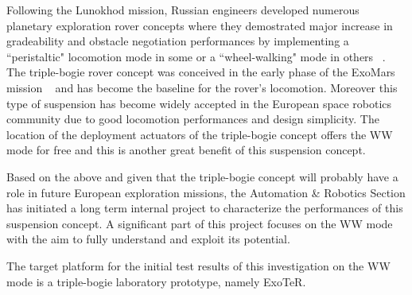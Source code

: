 \documentclass[a4paper,twocolumn]{esapub2005} %
\begin{document}
Following the Lunokhod mission, Russian engineers developed numerous planetary exploration rover concepts where they demostrated major increase in gradeability and obstacle negotiation performances by implementing a ``peristaltic" locomotion mode in some or a ``wheel-walking" mode in others ~\cite{Ehrenfreund1998}. The triple-bogie rover concept was conceived in the early phase of the ExoMars mission ~\cite{Patel2010} and has become the baseline for the rover's locomotion. Moreover this type of suspension has become widely accepted in the European space robotics community due to good locomotion performances and design simplicity. The location of the deployment actuators of the triple-bogie concept offers the WW mode for free and this is another great benefit of this suspension concept.

Based on the above and given that the triple-bogie concept will probably have a
role in future European exploration missions, the Automation \& Robotics
Section has initiated a long term internal project to characterize the
performances of this suspension concept. A significant part of this project
focuses on the WW mode with the aim to fully understand and exploit its
potential.

The target platform for the initial test results of this investigation on the
WW mode is a triple-bogie laboratory prototype, namely ExoTeR. 

%
\end{document}

